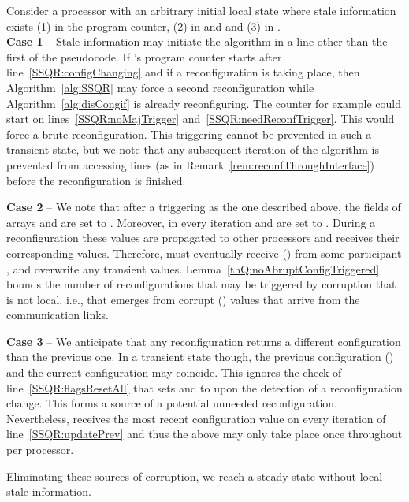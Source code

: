 \documentclass[11pt]{article}
\newenvironment{proof}{\noindent{\bf Proof.}}{\hfill}
\begin{document}
\begin{proof}
Consider a processor  with an arbitrary initial local state where stale information exists  (1) in the program counter, (2) in  and  and (3) in . \\
\textbf{Case 1} -- Stale information may initiate the algorithm in a line other than the first of the pseudocode.
If 's program counter starts after line~\ref{SSQR:configChanging} and if a reconfiguration is taking place, then Algorithm~\ref{alg:SSQR} may force a second reconfiguration while Algorithm~\ref{alg:disCongif} is already reconfiguring.
The counter for example could start on lines~\ref{SSQR:noMajTrigger} and~\ref{SSQR:needReconfTrigger}.
This would force a brute reconfiguration.
This triggering cannot be prevented in such a transient state, but we note that any subsequent iteration of the algorithm is prevented from accessing  lines (as in  Remark~\ref{rem:reconfThroughInterface}) before the reconfiguration is finished.



\noindent\textbf{Case 2} -- We note that after a triggering as the one described above, the fields of arrays  and  are set to . 
Moreover, in every iteration  and  are set to .
During a reconfiguration these values are propagated to other processors and  receives their corresponding values.
Therefore,  must eventually receive  () from some participant , and overwrite any transient values.
Lemma~\ref{thQ:noAbruptConfigTriggered} bounds the number of reconfigurations that may be triggered by corruption that is not local, i.e., that emerges from corrupt  () values that arrive from the communication links.

\noindent\textbf{Case 3} -- We anticipate that any reconfiguration returns a different configuration than the previous one.
In a transient state though, the previous configuration () and the current configuration  may coincide.
This ignores the check of line~\ref{SSQR:flagsResetAll} that sets  and  to  upon the detection of a reconfiguration change. 
This forms a source of a potential unneeded reconfiguration.
Nevertheless,  receives the most recent configuration value on every iteration of line~\ref{SSQR:updatePrev} and thus the above may only take place once throughout  per processor.

\noindent Eliminating these sources of corruption, we reach a steady  state without local stale information.
\end{proof}
\vspace{.5em}
\end{document}
